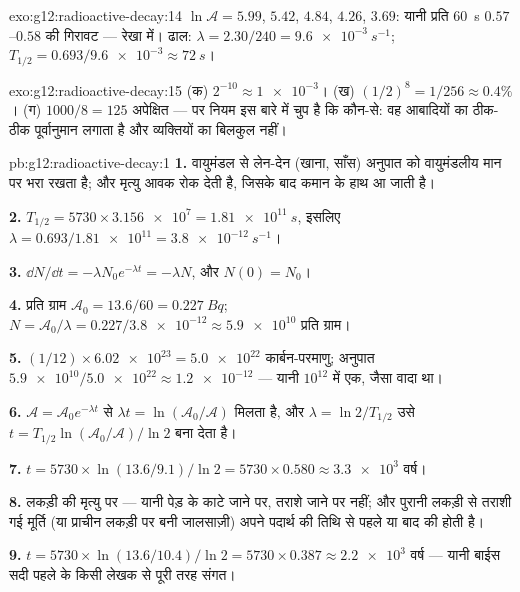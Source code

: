 \begin{solution}{exo:g12:radioactive-decay:14}
$\ln \mathcal A = 5.99$, $5.42$, $4.84$, $4.26$, $3.69$: यानी प्रति \qty{60}{s} $0.57$--$0.58$ की
गिरावट --- रेखा में। ढाल: $\lambda = 2.30/240 = \qty{9.6e-3}{s^{-1}}$; $T_{1/2} = 0.693/\num{9.6e-3} \approx \qty{72}{s}$।
\end{solution}

\begin{solution}{exo:g12:radioactive-decay:15}
(क) $2^{-10} \approx \num{1e-3}$। (ख) $(1/2)^8 = 1/256 \approx
0.4\%$। (ग) $1000/8 = 125$ अपेक्षित --- पर नियम इस बारे में चुप है कि
कौन-से: वह आबादियों का ठीक-ठीक पूर्वानुमान लगाता है और व्यक्तियों का बिलकुल
नहीं।
\end{solution}

\begin{solution}{pb:g12:radioactive-decay:1}
\textbf{1.} वायुमंडल से लेन-देन (खाना, साँस) अनुपात को वायुमंडलीय मान पर भरा
रखता है; और मृत्यु आवक रोक देती है, जिसके बाद कमान  के हाथ आ जाती है।

\textbf{2.} $T_{1/2} = \num{5730} \times \num{3.156e7} =
\qty{1.81e11}{s}$, इसलिए $\lambda = 0.693/\num{1.81e11} =
\qty{3.8e-12}{s^{-1}}$।

\textbf{3.} $\dd N/\dd t = -\lambda N_0 e^{-\lambda t} = -\lambda N$, और $N(0) = N_0$।

\textbf{4.} प्रति ग्राम $\mathcal A_0 = 13.6/60 = \qty{0.227}{Bq}$; $N = \mathcal A_0/\lambda = 0.227/\num{3.8e-12} \approx \num{5.9e10}$  प्रति ग्राम।

\textbf{5.} $(1/12) \times \num{6.02e23} = \num{5.0e22}$ कार्बन-परमाणु; अनुपात $\num{5.9e10}/\num{5.0e22} \approx \num{1.2e-12}$ --- यानी $10^{12}$ में
एक, जैसा वादा था।

\textbf{6.} $\mathcal A = \mathcal A_0 e^{-\lambda t}$ से $\lambda t = \ln(\mathcal A_0/\mathcal A)$ मिलता है, और $\lambda =
\ln 2/T_{1/2}$ उसे $t = T_{1/2}\ln(\mathcal A_0/\mathcal A)/\ln 2$ बना देता है।

\textbf{7.} $t = \num{5730} \times \ln(13.6/9.1)/\ln 2 =
\num{5730} \times 0.580 \approx \num{3.3e3}$ वर्ष।

\textbf{8.} लकड़ी की मृत्यु पर --- यानी पेड़ के काटे जाने पर, तराशे जाने पर
नहीं; और पुरानी लकड़ी से तराशी गई मूर्ति (या प्राचीन लकड़ी पर बनी जालसाज़ी) अपने
पदार्थ की तिथि से पहले या बाद की होती है।

\textbf{9.} $t = \num{5730} \times \ln(13.6/10.4)/\ln 2 =
\num{5730} \times 0.387 \approx \num{2.2e3}$ वर्ष --- यानी बाईस सदी पहले के किसी लेखक से पूरी तरह
संगत।


\end{solution}
